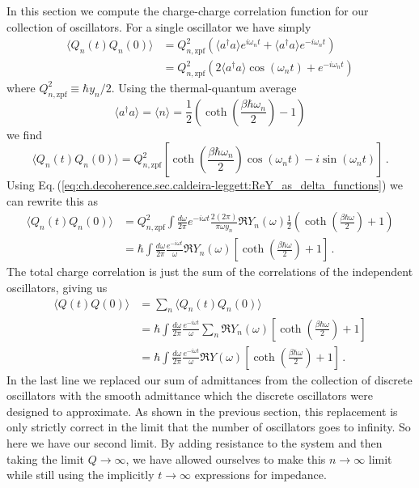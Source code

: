 
In this section we compute the charge-charge correlation function for our collection of oscillators.
For a single oscillator we have simply
\begin{align}
\langle Q_n(t) Q_n(0) \rangle
&= Q_{n,\text{zpf}}^2 \left( \langle a^\dagger a \rangle e^{i \omega_n t} + \langle a^\dagger a \rangle e^{-i \omega_n t} \right) \\
&= Q_{n,\text{zpf}}^2 \left( 2\langle a^\dagger a \rangle \cos(\omega_n t) + e^{-i \omega_n t} \right)
\end{align}
where $Q_{n,\text{zpf}}^2 \equiv \hbar y_n / 2$.
Using the thermal-quantum average
\begin{equation}
\langle a^\dagger a \rangle = \langle n \rangle = \frac{1}{2} \left( \coth \left( \frac{\beta \hbar \omega_n}{2} \right) - 1 \right)
\end{equation}
we find
\begin{equation}
\langle Q_n(t) Q_n(0) \rangle
= Q_{n,\text{zpf}}^2 \left[ \coth \left( \frac{\beta \hbar \omega_n}{2} \right) \cos(\omega_n t) -i \sin ( \omega_n t) \right] \, .
\end{equation}
Using Eq.\,(\ref{eq:ch.decoherence.sec.caldeira-leggett:ReY_as_delta_functions}) we can rewrite this as
\begin{align}
\langle Q_n(t) Q_n(0) \rangle
&= Q_{n,\text{zpf}}^2
\int \frac{d\omega}{2 \pi} e^{-i \omega t} \frac{2 (2\pi)}{\pi \omega y_n} \Re Y_n(\omega) \frac{1}{2} \left( \coth \left( \frac{\beta \hbar \omega}{2} \right) + 1 \right) \\
&= \hbar \int \frac{d\omega}{2 \pi} \frac{e^{-i \omega t}}{\omega} \Re Y_n (\omega) \left[ \coth \left( \frac{\beta \hbar \omega}{2} \right) + 1 \right] \, .
\end{align}
The total charge correlation is just the sum of the correlations of the independent oscillators, giving us
\begin{align}
\langle Q(t) Q(0) \rangle
&= \sum_n \langle Q_n(t) Q_n(0) \rangle \\
&= \hbar \int \frac{d\omega}{2 \pi} \frac{e^{-i \omega t}}{\omega} \sum_n \Re Y_n (\omega) \left[ \coth \left( \frac{\beta \hbar \omega}{2} \right) + 1 \right] \\
&= \hbar \int \frac{d\omega}{2 \pi} \frac{e^{-i \omega t}}{\omega} \Re Y(\omega) \left[ \coth \left( \frac{\beta \hbar \omega}{2} \right) + 1 \right] \, .
\end{align}
In the last line we replaced our sum of admittances from the collection of discrete oscillators with the smooth admittance which the discrete oscillators were designed to approximate.
As shown in the previous section, this replacement is only strictly correct in the limit that the number of oscillators goes to infinity.
So here we have our second limit.
By adding resistance to the system and then taking the limit $Q \rightarrow \infty$, we have allowed ourselves to make this $n \rightarrow \infty$ limit while still using the implicitly  $t \rightarrow \infty$ expressions for impedance.

